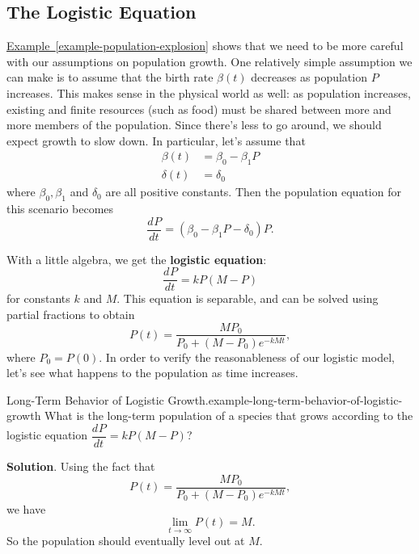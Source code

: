 \documentclass[10pt,]{book}
\newcommand{\terminology}[1]{\textbf{#1}}
\numberwithin{equation}{section}
\newcommand{\dv}[3][]{\dfrac{d^{#1} #2}{d #3^{#1}}}
\begin{document}
\subsection[{The Logistic Equation}]{The Logistic Equation}\label{subsection-the-logistic-equation}
\hypertarget{p-743}{}%
\hyperref[example-population-explosion]{Example~\ref{example-population-explosion}} shows that we need to be more careful with our assumptions on population growth. One relatively simple assumption we can make is to assume that the birth rate \(\beta(t)\) decreases as population \(P\) increases. This makes sense in the physical world as well: as population increases, existing and finite resources (such as food) must be shared between more and more members of the population. Since there's less to go around, we should expect growth to slow down. In particular, let's assume that%
\begin{align*}
\beta(t) & = \beta_{0} - \beta_{1}P \\
\delta(t) & = \delta_{0} 
\end{align*}
where \(\beta_{0},\beta_{1}\) and \(\delta_{0}\) are all positive constants. Then the population equation for this scenario becomes%
\begin{equation*}
\dv{P}{t} = (\beta_{0} - \beta_{1}P - \delta_{0})P.
\end{equation*}
%
\par
\hypertarget{p-744}{}%
With a little algebra, we get the \terminology{logistic equation}:%
\begin{equation*}
\dv{P}{t} = kP(M-P)
\end{equation*}
for constants \(k\) and \(M\). This equation is separable, and can be solved using partial fractions to obtain%
\begin{equation*}
P(t) = \frac{MP_{0}}{P_{0} + (M - P_{0})e^{-kMt}},
\end{equation*}
where \(P_{0} = P(0)\). In order to verify the reasonableness of our logistic model, let's see what happens to the population as time increases.%
\begin{example}{Long-Term Behavior of Logistic Growth.}{example-long-term-behavior-of-logistic-growth}%
\hypertarget{p-745}{}%
What is the long-term population of a species that grows according to the logistic equation \(\dv{P}{t} = kP(M-P)\)?%
\par\smallskip%
\noindent\textbf{Solution}.\hypertarget{solution-156}{}\quad%
\hypertarget{p-746}{}%
Using the fact that%
\begin{equation*}
P(t) = \frac{MP_{0}}{P_{0} + (M - P_{0})e^{-kMt}},
\end{equation*}
we have%
\begin{equation*}
\lim_{t\to\infty}P(t) = M.
\end{equation*}
So the population should eventually level out at \(M\).%
\end{example}
\end{document}
